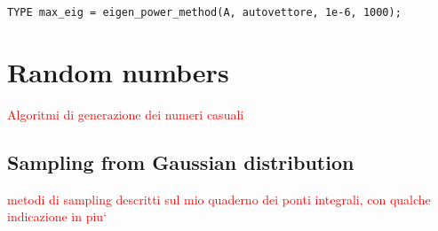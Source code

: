\documentclass[10pt]{article}
\begin{document}
\texttt{TYPE max\_eig = eigen\_power\_method(A, autovettore, 1e-6, 1000);}






\newpage

\appendix

\section{Random numbers}

\textcolor{red}{Algoritmi di generazione dei numeri casuali}

\subsection{Sampling from Gaussian distribution}

\textcolor{red}{metodi di sampling descritti sul mio quaderno dei ponti integrali, con qualche indicazione in piu`}
\end{document}
